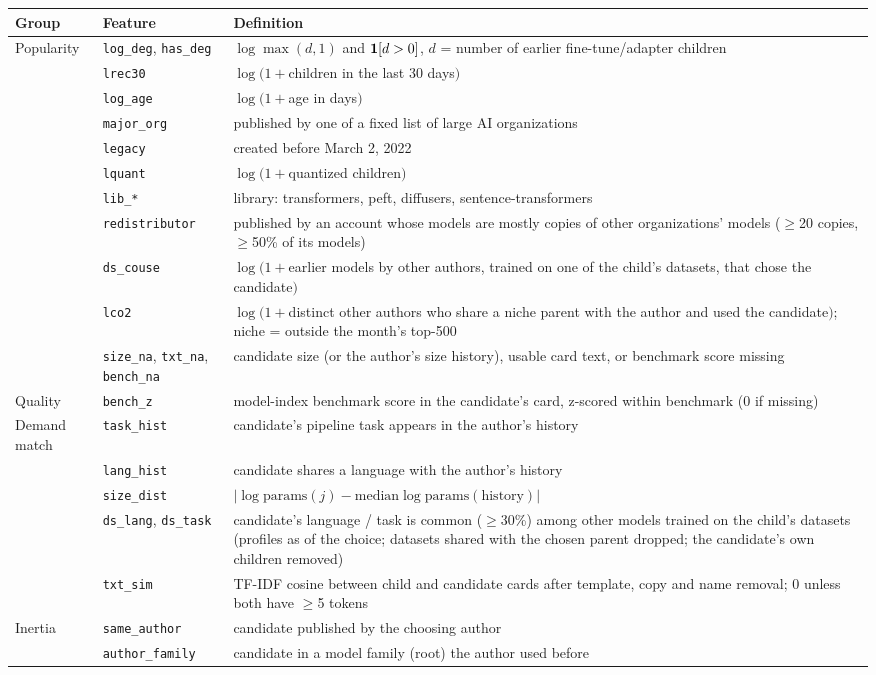 \begin{center}
\scriptsize
\begin{tabular}{llp{}}
\toprule
Group & Feature & Definition \\
\midrule
Popularity & \texttt{log\_deg}, \texttt{has\_deg} & $\log \max(d,1)$ and $\mathbf{1}[d>0]$, $d$ = number of earlier fine-tune/adapter children \\
 & \texttt{lrec30} & $\log(1+{}$children in the last 30 days$)$ \\
 & \texttt{log\_age} & $\log(1+{}$age in days$)$ \\
 & \texttt{major\_org} & published by one of a fixed list of large AI organizations \\
 & \texttt{legacy} & created before March 2, 2022 \\
 & \texttt{lquant} & $\log(1+{}$quantized children$)$ \\
 & \texttt{lib\_*} & library: transformers, peft, diffusers, sentence-transformers \\
 & \texttt{redistributor} & published by an account whose models are mostly copies of other organizations' models ($\ge$20 copies, $\ge$50\% of its models) \\
 & \texttt{ds\_couse} & $\log(1+{}$earlier models by other authors, trained on one of the child's datasets, that chose the candidate$)$ \\
 & \texttt{lco2} & $\log(1+{}$distinct other authors who share a niche parent with the author and used the candidate$)$; niche = outside the month's top-500 \\
 & \texttt{size\_na}, \texttt{txt\_na}, \texttt{bench\_na} & candidate size (or the author's size history), usable card text, or benchmark score missing \\
\midrule
Quality & \texttt{bench\_z} & model-index benchmark score in the candidate's card, z-scored within benchmark (0 if missing) \\
\midrule
Demand match & \texttt{task\_hist} & candidate's pipeline task appears in the author's history \\
 & \texttt{lang\_hist} & candidate shares a language with the author's history \\
 & \texttt{size\_dist} & $|\log \text{params}(j) - \text{median} \log \text{params}(\text{history})|$ \\
 & \texttt{ds\_lang}, \texttt{ds\_task} & candidate's language / task is common ($\ge$30\%) among other models trained on the child's datasets (profiles as of the choice; datasets shared with the chosen parent dropped; the candidate's own children removed) \\
 & \texttt{txt\_sim} & TF-IDF cosine between child and candidate cards after template, copy and name removal; 0 unless both have $\ge$5 tokens \\
\midrule
Inertia & \texttt{same\_author} & candidate published by the choosing author \\
 & \texttt{author\_family} & candidate in a model family (root) the author used before \\
\bottomrule
\end{tabular}
\end{center}

